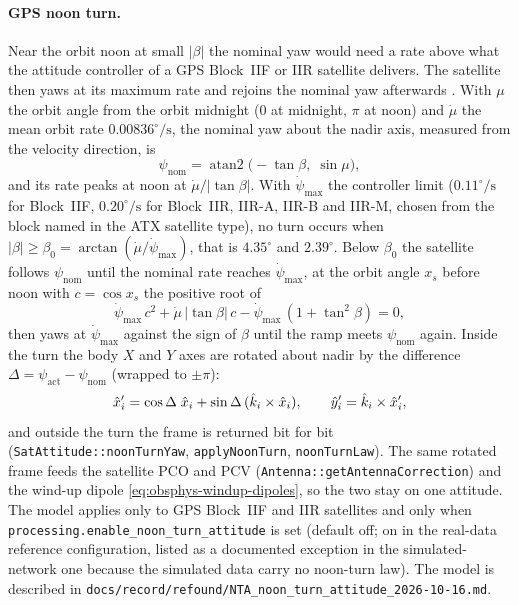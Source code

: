 \documentclass[main.tex]{subfiles}
\begin{document}
\paragraph{GPS noon turn.}
Near the orbit noon at small $|\beta|$ the nominal yaw would need a rate
above what the attitude controller of a GPS Block~IIF or IIR satellite
delivers.  The satellite then yaws at its maximum rate and rejoins the
nominal yaw afterwards \cite{kouba2009simplified}.  With $\mu$ the orbit angle from the orbit
midnight ($0$ at midnight, $\pi$ at noon) and $\dot\mu$ the mean orbit
rate $0.00836^\circ/\mathrm{s}$, the nominal yaw about the nadir axis,
measured from the velocity direction, is
\begin{equation}
\psi_{\mathrm{nom}} = \operatorname{atan2}\!\big(-\tan\beta,\;\sin\mu\big),
\label{eq:obsphys-yaw-nominal}
\end{equation}
and its rate peaks at noon at $\dot\mu/\lvert\tan\beta\rvert$.  With
$\dot\psi_{\max}$ the controller limit ($0.11^\circ/\mathrm{s}$ for Block~IIF,
$0.20^\circ/\mathrm{s}$ for Block~IIR, IIR-A, IIR-B and IIR-M, chosen from
the block named in the ATX satellite type), no turn occurs when
$\lvert\beta\rvert\ge\beta_0 = \arctan(\dot\mu/\dot\psi_{\max})$, that is
$4.35^\circ$ and $2.39^\circ$.  Below $\beta_0$ the satellite follows
$\psi_{\mathrm{nom}}$ until the nominal rate reaches $\dot\psi_{\max}$, at
the orbit angle $x_s$ before noon with $c=\cos x_s$ the positive root of
\begin{equation}
\dot\psi_{\max}\,c^{2} + \dot\mu\,\lvert\tan\beta\rvert\,c
 - \dot\psi_{\max}\,(1+\tan^{2}\beta) = 0 ,
\label{eq:obsphys-noon-start}
\end{equation}
then yaws at $\dot\psi_{\max}$ against the sign of $\beta$ until the ramp
meets $\psi_{\mathrm{nom}}$ again.  Inside the turn the body $X$ and $Y$
axes are rotated about nadir by the difference
$\Delta=\psi_{\mathrm{act}}-\psi_{\mathrm{nom}}$ (wrapped to $\pm\pi$):
\begin{equation}
\hat{x}_i' = \cos\Delta\;\hat{x}_i + \sin\Delta\,(\hat{k}_i\times\hat{x}_i),
\qquad
\hat{y}_i' = \hat{k}_i\times\hat{x}_i' ,
\label{eq:obsphys-noon-rotate}
\end{equation}
and outside the turn the frame is returned bit for bit
(\texttt{SatAttitude::noonTurnYaw}, \texttt{applyNoonTurn},
\texttt{noonTurnLaw}).  The same rotated frame feeds the satellite PCO
and PCV (\texttt{Antenna::getAntennaCorrection}) and the wind-up dipole
\eqref{eq:obsphys-windup-dipoles}, so the two stay on one attitude.  The
model applies only to GPS Block~IIF and IIR satellites and only when
\texttt{processing.enable\_noon\_turn\_attitude} is set (default off; on
in the real-data reference configuration, listed as a documented
exception in the simulated-network one because the simulated data carry no
noon-turn law).  The model is described in
\texttt{docs/record/refound/NTA\_noon\_turn\_attitude\_2026-10-16.md}.
\end{document}
